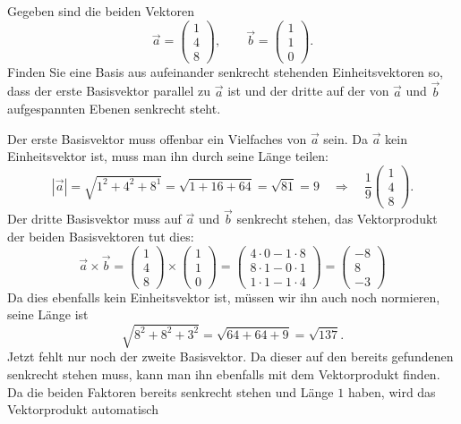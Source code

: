Gegeben sind die beiden Vektoren
\[
\vec a
=
\begin{pmatrix}
1\\4\\8
\end{pmatrix}
,\qquad
\vec b
=
\begin{pmatrix}
1\\1\\0
\end{pmatrix}.
\]
Finden Sie eine Basis aus aufeinander senkrecht stehenden
Einheitsvektoren so, dass der erste Basisvektor parallel zu
$\vec a$ ist und der dritte auf der von $\vec a$ und $\vec b$
aufgespannten Ebenen senkrecht steht.

\begin{loesung}
Der erste Basisvektor muss offenbar ein Vielfaches von $\vec a$ sein.
Da $\vec a$ kein Einheitsvektor ist, muss man ihn durch seine Länge
teilen:
\[
|\vec a|=\sqrt{1^2+4^2+8^1}=\sqrt{1+16+64}=\sqrt{81}=9
\quad
\Rightarrow
\quad
\frac19
\begin{pmatrix}
1\\4\\8
\end{pmatrix}.
\]
Der dritte Basisvektor muss auf $\vec a$ und $\vec b$ senkrecht stehen,
das Vektorprodukt der beiden Basisvektoren tut dies:
\[
\vec a\times\vec b=
\begin{pmatrix}
1\\4\\8
\end{pmatrix}
\times
\begin{pmatrix}
1\\1\\0
\end{pmatrix}
=
\begin{pmatrix}
4\cdot 0-1\cdot 8\\
8\cdot 1-0\cdot 1\\
1\cdot 1-1\cdot 4
\end{pmatrix}
=
\begin{pmatrix}
-8\\
8\\
-3
\end{pmatrix}
\]
Da dies ebenfalls kein Einheitsvektor ist, müssen wir ihn auch noch
normieren, seine Länge ist
\[
\sqrt{8^2+8^2+ 3^2}=\sqrt{64+64+9}=\sqrt{137}.
\]
Jetzt fehlt nur noch der zweite Basisvektor.
Da dieser auf den bereits
gefundenen senkrecht stehen muss, kann man ihn ebenfalls mit 
dem Vektorprodukt finden. Da die beiden Faktoren bereits senkrecht
stehen und Länge $1$ haben, wird das Vektorprodukt automatisch

\end{loesung}
